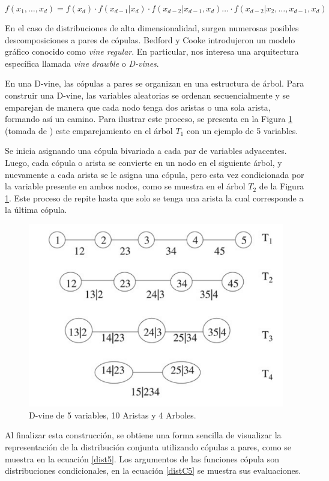 \begin{equation}\label{fact1}
    f(x_1, \dots, x_d) = f(x_d) \cdot f(x_{d-1}|x_d) \cdot f(x_{d-2} | x_{d-1}, x_{d}) \dots \cdot  f(x_{d-2} | x_{2}, \dots, x_{d-1}, x_{d})
\end{equation}

En el caso de distribuciones de alta dimensionalidad, surgen numerosas posibles descomposiciones a pares de cópulas. Bedford y Cooke introdujeron un modelo gráfico conocido como \textit{vine regular}. En particular, nos interesa una arquitectura específica llamada \textit{vine drawble} o \textit{D-vines}.

En una D-vine, las cópulas a pares se organizan en una estructura de árbol. Para construir una D-vine, las variables aleatorias se ordenan secuencialmente y se emparejan de manera que cada nodo tenga dos aristas o una sola arista, formando así un camino. Para ilustrar este proceso, se presenta en la Figura \ref{fig:Dvine5} (tomada de \cite{PairCopula}) este emparejamiento en el árbol $T_1$ con un ejemplo de 5 variables.

Se inicia asignando una cópula bivariada a cada par de variables adyacentes. Luego, cada cópula o arista se convierte en un nodo en el siguiente árbol, y nuevamente a cada arista se le asigna una cópula, pero esta vez condicionada por la variable presente en ambos nodos, como se muestra en el árbol $T_2$ de la Figura \ref{fig:Dvine5}. Este proceso de repite hasta que solo se tenga una arista la cual corresponde a la última cópula. 

\begin{figure}[H]
    \centering
    \includegraphics[width = 0.6 \textwidth]{Imagenes/Dvine5var.png}
    \caption{D-vine de 5 variables, 10 Aristas y 4 Arboles.}
    \label{fig:Dvine5}
\end{figure}

Al finalizar esta construcción, se obtiene una forma sencilla de visualizar la representación de la distribución conjunta utilizando cópulas a pares, como se muestra en la ecuación \eqref{dist5}. Los argumentos de las funciones cópula son distribuciones condicionales, en la ecuación \eqref{distC5} se muestra sus evaluaciones.


